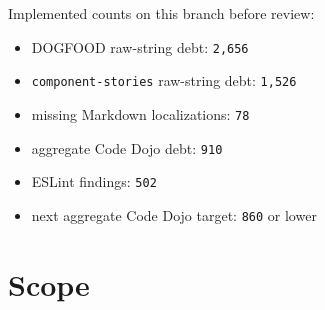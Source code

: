 Implemented counts on this branch before review:

\begin{itemize}
\tightlist
\item
  DOGFOOD raw-string debt: \texttt{2\allowbreak{},\allowbreak{}6\allowbreak{}5\allowbreak{}6}
\item
  \texttt{c\allowbreak{}o\allowbreak{}m\allowbreak{}p\allowbreak{}o\allowbreak{}n\allowbreak{}e\allowbreak{}n\allowbreak{}t\allowbreak{}-\allowbreak{}s\allowbreak{}t\allowbreak{}o\allowbreak{}r\allowbreak{}i\allowbreak{}e\allowbreak{}s} raw-string debt: \texttt{1\allowbreak{},\allowbreak{}5\allowbreak{}2\allowbreak{}6}
\item
  missing Markdown localizations: \texttt{7\allowbreak{}8}
\item
  aggregate Code Dojo debt: \texttt{9\allowbreak{}1\allowbreak{}0}
\item
  ESLint findings: \texttt{5\allowbreak{}0\allowbreak{}2}
\item
  next aggregate Code Dojo target: \texttt{8\allowbreak{}6\allowbreak{}0} or lower
\end{itemize}

\section{Scope}\label{record-197-scope}

